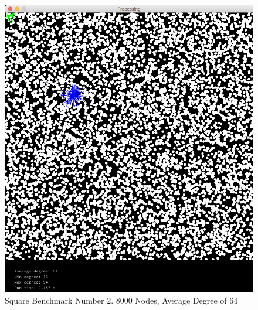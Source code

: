 \documentclass{article}
\begin{document}
\begin{center}
    \begin{figure}
        \includegraphics[scale=0.45]{./images/square_1.png}
        \caption{Square Benchmark Number 2. 8000 Nodes, Average Degree of 64}
        \label{square1}
    \end{figure}
\end{center}
\end{document}
